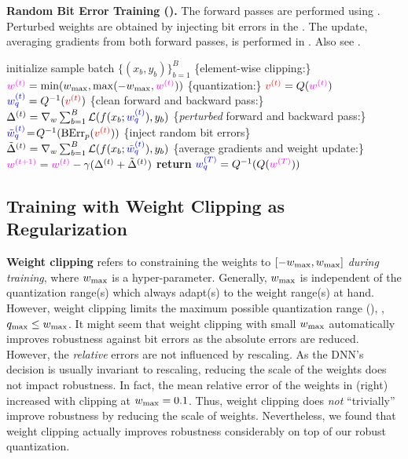 \begin{algorithm}[t]
\caption{\textbf{Random Bit Error Training (\Random).} The forward passes are performed using . Perturbed weights are obtained by injecting bit errors in the . The update, averaging gradients from both forward passes, is performed in . Also see .}
\label{alg:training}
\begin{algorithmic}[1]
\small
{}
    \State initialize 
    	\State sample batch $\{(x_b, y_b)\}_{b = 1}^B$
    	\State \{element-wise clipping:\}
    	\State $\magenta{w^{(t)}} = \min(\wmax, \max(-\wmax, \magenta{w^{(t)}}))$
    	\State \{quantization:\}
    	\State $\red{v^{(t)}} = Q(\magenta{w^{(t)}})$
        \State $\blue{w_q^{(t)}} = Q^{-1}(\red{v^{(t)}})$
        \State \{clean forward and backward pass:\}
        \State $\Delta^{(t)} = \nabla_w \sum_{b = 1}^B \mathcal{L}(f(x_b; \blue{w_q^{(t)}}), y_b)$
        \State \{\emph{perturbed} forward and backward pass:\}
        \State $\blue{\tilde{w}_q^{(t)}}{\hskip 1px=\hskip 1px}Q^{-1}(\biterror_p(\red{v^{(t)}}))$\label{line:attack} \{inject random bit errors\}
        \State $\tilde{\Delta}^{(t)} = \nabla_w \sum_{b = 1}^B \mathcal{L}(f(x_b; \blue{\tilde{w}_q^{(t)}}), y_b)$
        \State \{average gradients and weight update:\}
        \State $\magenta{w^{(t + 1)}} = \magenta{w^{(t)}} - \gamma(\Delta^{(t)} + \tilde{\Delta}^{(t)})$
    \EndFor
    \State \textbf{return} $\blue{w_q^{(T)}} = Q^{-1}(Q(\magenta{w^{(T)}}))$
\EndProcedure
\end{algorithmic}
\end{algorithm}

\subsection{Training with Weight Clipping as Regularization}
\label{subsec:robustness-clipping}

\textbf{Weight clipping} refers to constraining the weights to $[-\wmax, \wmax]$ \emph{during training}, where $\wmax$ is a hyper-parameter. Generally, $\wmax$ is independent of the quantization range(s) which always adapt(s) to the weight range(s) at hand. However, weight clipping limits the maximum possible quantization range (\cf {}), \ie, $\qmax \leq \wmax$.
It might seem that weight clipping with small $\wmax$ automatically improves robustness against bit errors as the absolute errors are reduced. However, the \emph{relative} errors are not influenced by rescaling. As the DNN's decision is usually invariant to rescaling, reducing the scale of the weights does not impact robustness. In fact, the mean relative error of the weights in  (right) increased with clipping at $\wmax = 0.1$. Thus, weight clipping does \emph{not} ``trivially'' improve robustness by reducing the scale of weights. Nevertheless, we found that weight clipping actually improves robustness considerably on top of our robust quantization.

